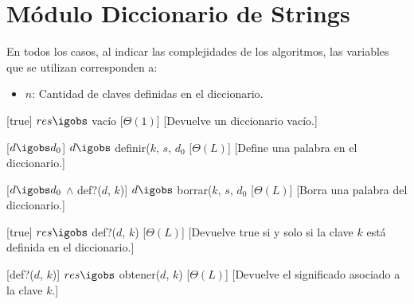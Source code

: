 \section{M\'{o}dulo Diccionario de Strings}

  En todos los casos, al indicar las complejidades de los algoritmos, las variables que se utilizan corresponden a:
  \vspace{-0.5em}\begin{itemize}
    \item $n$: Cantidad de claves definidas en el diccionario.
  \end{itemize}

\begin{Interfaz}
  
  \begin{paramFormales}
    \paramGeneros{$\alpha$}

    

  \end{paramFormales}




    [true]
    {$res \igobs$ vac\'{i}o}
    [$\Theta(1)$]
    [Devuelve un diccionario vac\'io.]

    [$d \igobs d_{0}$]
    {$d \igobs$ definir($k$, $s$, $d_{0}$}
    [$\Theta(L)$]
    [Define una palabra en el diccionario.]

    [$d \igobs d_{0}$ $\land$ def?($d$, $k$)]
    {$d \igobs$ borrar($k$, $s$, $d_{0}$}
    [$\Theta(L)$]
    [Borra una palabra del diccionario.]

    [true]
    {$res \igobs$ def?($d$, $k$)}
    [$\Theta(L)$]
    [Devuelve true si y solo si la clave $k$ est\'a definida en el diccionario.]

    [def?($d$, $k$)]
    {$res \igobs$ obtener($d$, $k$)}
    [$\Theta(L)$]
    [Devuelve el significado asociado a la clave $k$.]

\end{Interfaz}
